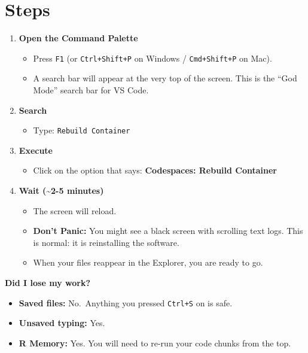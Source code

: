 \documentclass[
  letterpaper,
  DIV=11,
  numbers=noendperiod,
  oneside]{scrreprt}
\providecommand{\tightlist}{%
  \setlength{\itemsep}{0pt}\setlength{\parskip}{0pt}}
\begin{document}
\section{Steps}\label{steps-3}

\begin{enumerate}
\def\labelenumi{\arabic{enumi}.}
\tightlist
\item
  \textbf{Open the Command Palette}

  \begin{itemize}
  \tightlist
  \item
    Press \texttt{F1} (or \texttt{Ctrl+Shift+P} on Windows /
    \texttt{Cmd+Shift+P} on Mac).
  \item
    A search bar will appear at the very top of the screen. This is the
    ``God Mode'' search bar for VS Code.
  \end{itemize}
\item
  \textbf{Search}

  \begin{itemize}
  \tightlist
  \item
    Type: \texttt{Rebuild\ Container}
  \end{itemize}
\item
  \textbf{Execute}

  \begin{itemize}
  \tightlist
  \item
    Click on the option that says: \textbf{Codespaces: Rebuild
    Container}
  \end{itemize}
\item
  \textbf{Wait (\textasciitilde2-5 minutes)}

  \begin{itemize}
  \tightlist
  \item
    The screen will reload.
  \item
    \textbf{Don't Panic:} You might see a black screen with scrolling
    text logs. This is normal: it is reinstalling the software.
  \item
    When your files reappear in the Explorer, you are ready to go.
  \end{itemize}
\end{enumerate}

\textbf{Did I lose my work?}

\begin{itemize}
\item
  \textbf{Saved files:} No.~Anything you pressed \texttt{Ctrl+S} on is
  safe.
\item
  \textbf{Unsaved typing:} Yes.
\item
  \textbf{R Memory:} Yes. You will need to re-run your code chunks from
  the top.
\end{itemize}
\end{document}
